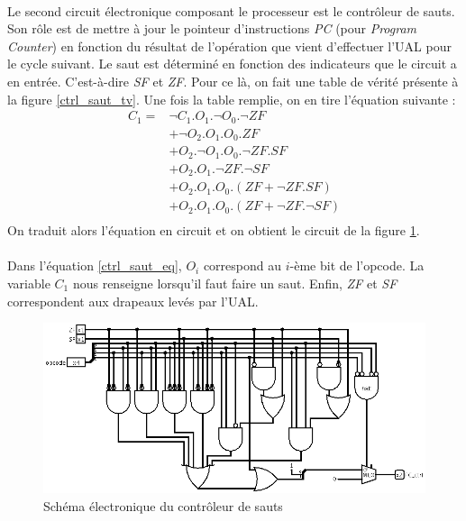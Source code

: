 \paragraph{}{
	Le second circuit électronique composant le processeur est
	le contrôleur de sauts. Son rôle est de mettre à jour le pointeur
	d'instructions \textit{PC} (pour \textit{Program Counter})
	en fonction du résultat de l'opération que vient d'effectuer
	l'UAL pour le cycle suivant. Le saut est déterminé en fonction
	des indicateurs que le circuit a en entrée. C'est-à-dire 
	\textit{SF} et \textit{ZF}. Pour ce là, on fait une table de
	vérité présente à la figure \ref{ctrl_saut_tv}. Une 
	fois la	table remplie, on en tire l'équation suivante :
	\begin{equation}
		\label{ctrl_saut_eq}
		\begin{split}
		C_{1} = & \neg C_{1} . O_{1} . \neg O_{0} . \neg{ZF} \\
				& + \neg O_{2} . O_{1} . O_{0} .  {ZF} \\
				& + O_{2} . \neg O_{1} . O_{0} . \neg{ZF} . {SF} \\
				& + O_{2} . O_{1} . \neg{ZF} . \neg{SF} \\
				& + O_{2} . O_{1} . O_{0} . ( {ZF} + \neg{ZF} . {SF}) \\
				& + O_{2} . O_{1} . O_{0} . ( {ZF} + \neg{ZF} . \neg{SF} ) \\
		\end{split}
	\end{equation}
	On traduit alors l'équation en circuit et on obtient le circuit
	de la figure \ref{control_saut_circ}.
}

\paragraph{}{
	Dans l'équation \ref{ctrl_saut_eq}, $O_{i}$ correspond au $i$-ème
	bit de l'opcode. La variable $C_{1}$ nous renseigne lorsqu'il faut faire un saut.
	Enfin, \textit{ZF} et \textit{SF} correspondent aux drapeaux levés par l'UAL.
}

\begin{figure}[!ht]
	\centering
	\includegraphics[scale=0.4,origin=c]{circuits/control_saut.png}
	\caption{\label{control_saut_circ} Sch\'{e}ma \'{e}lectronique du contr\^{o}leur de sauts}
\end{figure}

